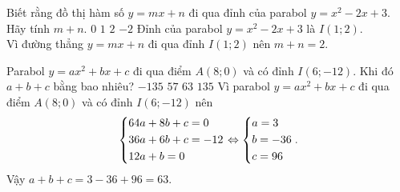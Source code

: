 \begin{ex}%
 Biết rằng đồ thị hàm số $y = mx + n$ đi qua đỉnh của parabol $y = x^2 - 2x + 3$. Hãy tính $m + n$.
 \choice
  {$0$}
  {$1$}
  {\True $2$}
  {$-2$}
 \loigiai
 {
 Đỉnh của parabol $y = x^2 - 2x + 3$ là $I(1;2)$.\\
 Vì đường thẳng $y = mx + n$ đi qua đỉnh $I(1;2)$ nên $m + n = 2$.
 }
\end{ex}


\begin{ex}%
 Parabol $y = ax^2 + bx + c$ đi qua điểm $A(8;0)$ và có đỉnh $I(6;-12)$. Khi đó $a + b + c$ bằng bao nhiêu?
 \choice
  {$-135$}
  {$57$}
  {\True $63$}
  {$135$}
 \loigiai
 {
 Vì parabol $y = ax^2 + bx + c$ đi qua điểm $A(8;0)$ và có đỉnh $I(6;-12)$ nên
 $$\left\{\begin{aligned}& 64a + 8b + c = 0 \\& 36a + 6b + c = -12 \\& 12a + b = 0\end{aligned}\right. \Leftrightarrow \left\{\begin{aligned}& a = 3 \\& b = -36 \\& c = 96\end{aligned}\right..$$
 Vậy $a + b + c = 3 - 36 + 96 = 63$.
 }
\end{ex}


